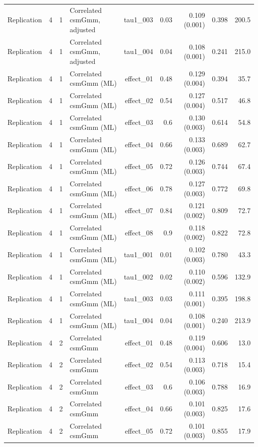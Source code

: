 \begin{longtable}{lcclrrrrr}
Replication & 4 & 1 & Correlated csmGmm, adjusted & tau1\_003 & 0.03 & 0.109 (0.001) & 0.398 & 200.5\\
Replication & 4 & 1 & Correlated csmGmm, adjusted & tau1\_004 & 0.04 & 0.108 (0.001) & 0.241 & 215.0\\
Replication & 4 & 1 & Correlated csmGmm (ML) & effect\_01 & 0.48 & 0.129 (0.004) & 0.394 & 35.7\\
Replication & 4 & 1 & Correlated csmGmm (ML) & effect\_02 & 0.54 & 0.127 (0.004) & 0.517 & 46.8\\
Replication & 4 & 1 & Correlated csmGmm (ML) & effect\_03 & 0.6 & 0.130 (0.003) & 0.614 & 54.8\\
Replication & 4 & 1 & Correlated csmGmm (ML) & effect\_04 & 0.66 & 0.133 (0.003) & 0.689 & 62.7\\
Replication & 4 & 1 & Correlated csmGmm (ML) & effect\_05 & 0.72 & 0.126 (0.003) & 0.744 & 67.4\\
Replication & 4 & 1 & Correlated csmGmm (ML) & effect\_06 & 0.78 & 0.127 (0.003) & 0.772 & 69.8\\
Replication & 4 & 1 & Correlated csmGmm (ML) & effect\_07 & 0.84 & 0.121 (0.002) & 0.809 & 72.7\\
Replication & 4 & 1 & Correlated csmGmm (ML) & effect\_08 & 0.9 & 0.118 (0.002) & 0.822 & 72.8\\
Replication & 4 & 1 & Correlated csmGmm (ML) & tau1\_001 & 0.01 & 0.102 (0.003) & 0.780 & 43.3\\
Replication & 4 & 1 & Correlated csmGmm (ML) & tau1\_002 & 0.02 & 0.110 (0.002) & 0.596 & 132.9\\
Replication & 4 & 1 & Correlated csmGmm (ML) & tau1\_003 & 0.03 & 0.111 (0.001) & 0.395 & 198.8\\
Replication & 4 & 1 & Correlated csmGmm (ML) & tau1\_004 & 0.04 & 0.108 (0.001) & 0.240 & 213.9\\
Replication & 4 & 2 & Correlated csmGmm & effect\_01 & 0.48 & 0.119 (0.004) & 0.606 & 13.0\\
Replication & 4 & 2 & Correlated csmGmm & effect\_02 & 0.54 & 0.113 (0.003) & 0.718 & 15.4\\
Replication & 4 & 2 & Correlated csmGmm & effect\_03 & 0.6 & 0.106 (0.003) & 0.788 & 16.9\\
Replication & 4 & 2 & Correlated csmGmm & effect\_04 & 0.66 & 0.101 (0.003) & 0.825 & 17.6\\
Replication & 4 & 2 & Correlated csmGmm & effect\_05 & 0.72 & 0.101 (0.003) & 0.855 & 17.9\\

\end{longtable}
